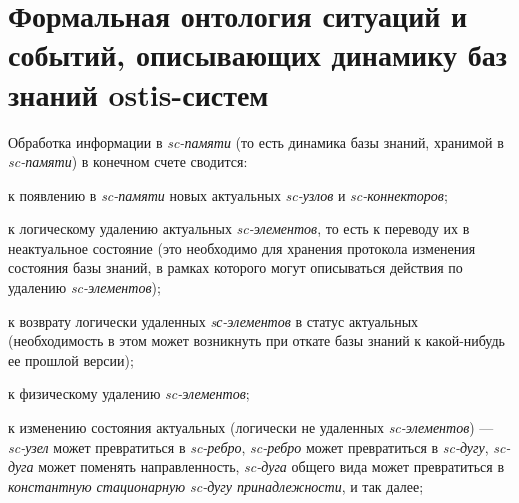 \begin{comment}
\begin{SCn}
\scnheader{следует отличать*}
\begin{scnhaselementset}
\scnitem{темпоральное совпадение*}
	\begin{scnindent}
	\scniselement{отношение эквивалентности}
	\end{scnindent}
	\scnitem{одновременность\scnsupergroupsign}
	\begin{scnindent}
	\scnidtf{фактор-множество для отношения темпоральное совпадение*}
	\end{scnindent}
\end{scnhaselementset}
		
\scnheader{длительность\scnsupergroupsign}
\scnidtf{класс временных сущностей, имеющих одинаковую длительность\scnsupergroupsign}
\scniselement{параметр}
\scnhaselement{тысячелетие}
\scnhaselement{век}
\scnhaselement{год}
\scnhaselement{месяц}
\scnhaselement{день}
\scnhaselement{час}
\scnhaselement{минута}
\scnhaselement{секунда}
\end{SCn}

Каждый элемент множества \textbf{\textit{длительность}} представляет собой класс \textit{временных сущностей}, у которых совпадает длительность их существования. Конкретное значение данного \textit{параметра} может быть как \textit{точной величиной}, так и \textit{неточной величиной} или \textit{интервальной величиной}.
\end{comment}

\section{Формальная онтология ситуаций и событий, описывающих динамику баз знаний ostis-систем}
\label{sec_top_ontologies_dynamic}

Обработка информации в \textit{sc-памяти} (то есть динамика базы знаний, хранимой в \textit{sc-памяти}) в конечном счете сводится:
\begin{textitemize}
	\item к появлению в \textit{sc-памяти} новых актуальных \textit{sc-узлов} и \textit{sc-коннекторов};
	\item к логическому удалению актуальных \textit{sc-элементов}, то есть к переводу их в неактуальное состояние (это необходимо для хранения протокола изменения состояния базы знаний, в рамках которого могут описываться действия по удалению \textit{sc-элементов});
	\item к возврату логически удаленных \textit{sс-элементов} в статус актуальных (необходимость в этом может возникнуть при откате базы знаний к какой-нибудь ее прошлой версии);
	\item к физическому удалению \textit{sc-элементов};
	\item к изменению состояния актуальных (логически не удаленных \textit{sc-элементов}) --- \textit{sc-узел} может превратиться в \textit{sc-ребро}, \textit{sc-ребро} может превратиться в \textit{sc-дугу}, \textit{sc-дуга} может поменять направленность, \textit{sc-дуга} общего вида может превратиться в \textit{константную стационарную sc-дугу принадлежности}, и так далее;
\end{textitemize}

